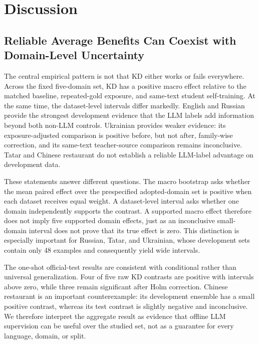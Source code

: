 \section{Discussion}\label{discussion}

\subsection{Reliable Average Benefits Can Coexist with Domain-Level
Uncertainty}\label{reliable-average-benefits-can-coexist-with-domain-level-uncertainty}

The central empirical pattern is not that KD either works or fails
everywhere. Across the fixed five-domain set, KD has a positive macro
effect relative to the matched baseline, repeated-gold exposure, and
same-text student self-training. At the same time, the dataset-level
intervals differ markedly. English and Russian provide the strongest
development evidence that the LLM labels add information beyond both
non-LLM controls. Ukrainian provides weaker evidence: its
exposure-adjusted comparison is positive before, but not after,
family-wise correction, and its same-text teacher-source comparison
remains inconclusive. Tatar and Chinese restaurant do not establish a
reliable LLM-label advantage on development data.

These statements answer different questions. The macro bootstrap asks
whether the mean paired effect over the prespecified adopted-domain set
is positive when each dataset receives equal weight. A dataset-level
interval asks whether one domain independently supports the contrast. A
supported macro effect therefore does not imply five supported domain
effects, just as an inconclusive small-domain interval does not prove
that its true effect is zero. This distinction is especially important
for Russian, Tatar, and Ukrainian, whose development sets contain only
48 examples and consequently yield wide intervals.

The one-shot official-test results are consistent with conditional
rather than universal generalization. Four of five raw KD contrasts are
positive with intervals above zero, while three remain significant after
Holm correction. Chinese restaurant is an important counterexample: its
development ensemble has a small positive contrast, whereas its test
contrast is slightly negative and inconclusive. We therefore interpret
the aggregate result as evidence that offline LLM supervision can be
useful over the studied set, not as a guarantee for every language,
domain, or split.

